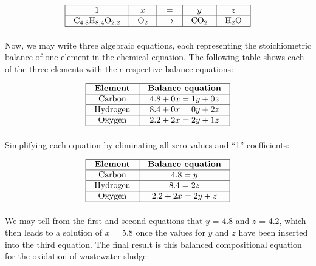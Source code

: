 
$$\vbox{\offinterlineskip
\halign{\strut
\vrule \quad\hfil # \ \hfil & 
\vrule \quad\hfil # \ \hfil & 
\vrule \quad\hfil # \ \hfil & 
\vrule \quad\hfil # \ \hfil & 
\vrule \quad\hfil # \ \hfil \vrule \cr
\noalign{\hrule}
%
1 & $x$ & = & $y$ & $z$ \cr
%
\noalign{\hrule}
%
$\hbox{C}_{4.8}\hbox{H}_{8.4}\hbox{O}_{2.2}$ & $\hbox{O}_2$ & $\to$ & $\hbox{CO}_2$ & $\hbox{H}_2\hbox{O}$ \cr
%
\noalign{\hrule}
} %
}$$ %

Now, we may write three algebraic equations, each representing the stoichiometric balance of one element in the chemical equation.  The following table shows each of the three elements with their respective balance equations:


$$\vbox{\offinterlineskip
\halign{\strut
\vrule \quad\hfil # \ \hfil & 
\vrule \quad\hfil # \ \hfil \vrule \cr
\noalign{\hrule}
%
\textbf{Element} & \textbf{Balance equation} \cr
%
\noalign{\hrule}
%
Carbon & $4.8 + 0x = 1y + 0z$ \cr
%
\noalign{\hrule}
%
Hydrogen & $8.4 + 0x = 0y + 2z$ \cr
%
\noalign{\hrule}
%
Oxygen & $2.2 + 2x = 2y + 1z$ \cr
%
\noalign{\hrule}
} %
}$$ %

Simplifying each equation by eliminating all zero values and ``1'' coefficients:


$$\vbox{\offinterlineskip
\halign{\strut
\vrule \quad\hfil # \ \hfil & 
\vrule \quad\hfil # \ \hfil \vrule \cr
\noalign{\hrule}
%
\textbf{Element} & \textbf{Balance equation} \cr
%
\noalign{\hrule}
%
Carbon & $4.8 = y$ \cr
%
\noalign{\hrule}
%
Hydrogen & $8.4 = 2z$ \cr
%
\noalign{\hrule}
%
Oxygen & $2.2 + 2x = 2y + z$ \cr
%
\noalign{\hrule}
} %
}$$ %

We may tell from the first and second equations that $y$ = 4.8 and $z$ = 4.2, which then leads to a solution of $x$ = 5.8 once the values for $y$ and $z$ have been inserted into the third equation.  The final result is this balanced compositional equation for the oxidation of wastewater sludge:

